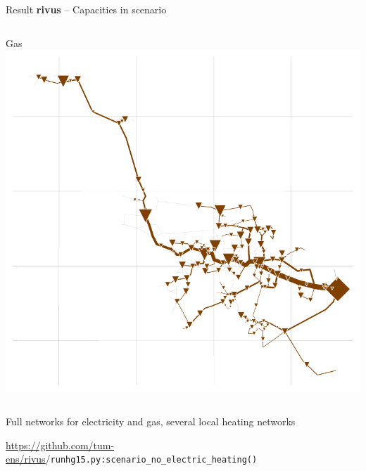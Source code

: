 \begin{frame}{Result \textbf{rivus} -- Capacities in scenario }
\begin{columns}
        \column{\squeezethree}
        	\centering
        	\textcolor{gas}{Gas} \vphantom{gÖ}
        	\includegraphics[width=\squeezethree]{img/haag/scenario_no_electric_heating-caps-Gas}
    \end{columns}

    \begin{center}
        Full networks for electricity and gas, several local heating networks
    \end{center}

    {\tiny \url{https://github.com/tum-ens/rivus}/\texttt{runhg15.py:scenario\_no\_electric\_heating()}}
\end{frame}

